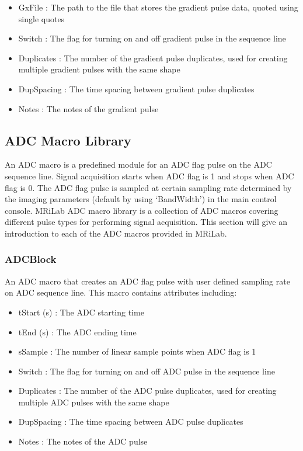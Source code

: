 \documentclass{book}%
\begin{document}
\begin{itemize}
	\item GxFile : The path to the file that stores the gradient pulse data, quoted using single quotes
	\item Switch : The flag for turning on and off gradient pulse in the sequence line
	\item Duplicates : The number of the gradient pulse duplicates, used for creating multiple gradient pulses with the same shape
	\item DupSpacing : The time spacing between gradient pulse duplicates
	\item Notes : The notes of the gradient pulse 
\end{itemize}


\subsection{ADC Macro Library}

An ADC macro is a predefined module for an ADC flag pulse on the ADC sequence line. Signal acquisition starts when ADC flag is 1 and stops when ADC flag is 0. The ADC flag pulse is sampled at certain sampling rate determined by the imaging parameters (default by using `BandWidth') in the main control console. MRiLab ADC macro library is a collection of ADC macros covering different pulse types for performing signal acquisition. This section will give an introduction to each of the ADC macros provided in MRiLab.

\subsubsection{ADCBlock}

An ADC macro that creates an ADC flag pulse with user defined sampling rate on ADC sequence line. This macro contains attributes including:

\begin{itemize}
	\item tStart (s) : The ADC starting time
	\item tEnd (s) : The ADC ending time
	\item sSample : The number of linear sample points when ADC flag is 1
	\item Switch : The flag for turning on and off ADC pulse in the sequence line
	\item Duplicates : The number of the ADC pulse duplicates, used for creating multiple ADC pulses with the same shape
	\item DupSpacing : The time spacing between ADC pulse duplicates
	\item Notes : The notes of the ADC pulse 
\end{itemize}
\end{document}
